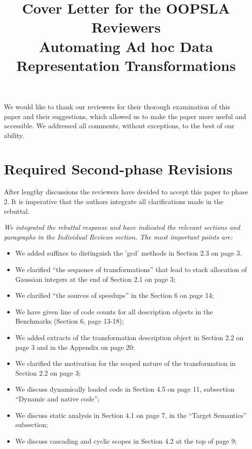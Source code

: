 \documentclass[9pt]{article}
\newenvironment{editorial-addr}
{ \color{OliveGreen} \framebox{{\bf REVISION}} }
{  }
\newenvironment{answer}
{ \em \framebox{{\bf AUTHOR RESPONSE}} }
{  }
\begin{document}
\title{Cover Letter for the OOPSLA Reviewers\\\Large Automating Ad hoc Data Representation Transformations}
\maketitle

We would like to thank our reviewers for their thorough examination of this paper and their suggestions, which allowed us to make the paper more useful and accessible. We addressed all comments, without exceptions, to the best of our ability.


\section{Required Second-phase Revisions}

\begin{editorial-addr}
After lengthy discussions the reviewers have decided to accept this paper to phase 2. It is imperative that the authors integrate all clarifications made in the rebuttal.
\end{editorial-addr}

\begin{answer}
We integrated the rebuttal response and have indicated the relevant sections and paragraphs in the Individual Reviews section.
The most important points are:

\begin{itemize}
\item We added suffixes to distinguish the 'gcd' methods in Section 2.3 on page 3.
\item We clarified ``the sequence of transformations'' that lead to stack allocation of Gaussian integers at the end of Section 2.1 on page 3;
\item We clarified ``the sources of speedups'' in the Section 6 on page 14;
\item We have given line of code counts for all description objects in the Benchmarks (Section 6, page 13-18);
\item We added extracts of the transformation description object in Section 2.2 on page 3 and in the Appendix on page 20;
\item We clarified the motivation for the scoped nature of the transformation in Section 2.2 on page 3;
\item We discuss dynamically loaded code in Section 4.5 on page 11, subsection ``Dynamic and native code'';
\item We discuss static analysis in Section 4.1 on page 7, in the ``Target Semantics'' subsection;
\item We discuss cascading and cyclic scopes in Section 4.2 at the top of page 9;
\end{itemize}
\end{answer}
\end{document}
